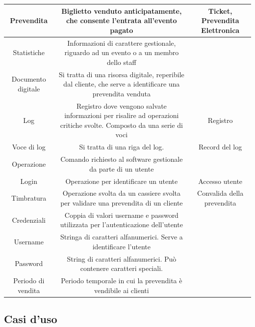 \documentclass[a4paper]{article}
\begin{document}
\begin{table}[ht!]
\begin{center}
\begin{tabulary}{1\textwidth}{c|C|C}
        \hline
        Prevendita & Biglietto venduto anticipatamente, che consente l'entrata all'evento pagato & Ticket, Prevendita Elettronica \\
        \hline
		Statistiche & Informazioni di carattere gestionale, riguardo ad un evento o a un membro dello staff & \\
		\hline
		Documento digitale & Si tratta di una risorsa digitale, reperibile dal cliente, che serve a identificare una prevendita venduta & \\
		\hline
		Log & Registro dove vengono salvate informazioni per risalire ad operazioni critiche svolte. Composto da una serie di voci & Registro \\
		\hline
		Voce di log & Si tratta di una riga del log. & Record del log\\
		\hline
		Operazione & Comando richiesto al software gestionale da parte di un utente & \\
		\hline
		Login & Operazione per identificare un utente & Accesso utente \\
		\hline
		Timbratura & Operazione svolta da un cassiere svolta per validare una prevendita di un cliente & Convalida della prevendita \\
		\hline
		Credenziali & Coppia di valori username e password utilizzata per l'autenticazione dell'utente & \\
		\hline
		Username & Stringa di caratteri alfanumerici. Serve a identificare l'utente & \\
		\hline
		Password & String di caratteri alfanumerici. Può contenere caratteri speciali. & \\
		\hline
		Periodo di vendita & Periodo temporale in cui la prevendita è vendibile ai clienti & \\
		\hline
    \end{tabulary}
  \end{center}
\end{table}

\newpage

\subsection{Casi d'uso}
\end{document}
